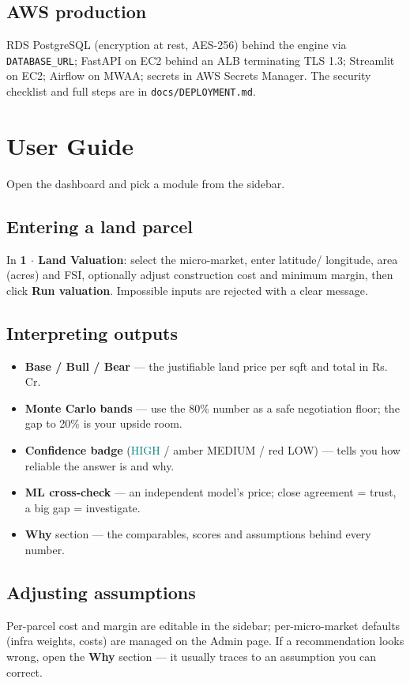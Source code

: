 \documentclass[11pt,a4paper]{article}
\begin{document}
\subsection{AWS production}
RDS PostgreSQL (encryption at rest, AES-256) behind the engine via
\texttt{DATABASE\_URL}; FastAPI on EC2 behind an ALB terminating TLS 1.3;
Streamlit on EC2; Airflow on MWAA; secrets in AWS Secrets Manager. The
security checklist and full steps are in \texttt{docs/DEPLOYMENT.md}.

\section{User Guide}
Open the dashboard and pick a module from the sidebar.

\subsection{Entering a land parcel}
In \textbf{1 $\cdot$ Land Valuation}: select the micro-market, enter latitude/
longitude, area (acres) and FSI, optionally adjust construction cost and minimum
margin, then click \textbf{Run valuation}. Impossible inputs are rejected with a
clear message.

\subsection{Interpreting outputs}
\begin{itemize}[noitemsep]
  \item \textbf{Base / Bull / Bear} --- the justifiable land price per sqft and total in  Rs.\,Cr.
  \item \textbf{Monte Carlo bands} --- use the 80\% number as a safe negotiation floor; the gap to 20\% is your upside room.
  \item \textbf{Confidence badge} (\textcolor{teal}{HIGH} / amber MEDIUM / red LOW) --- tells you how reliable the answer is and why.
  \item \textbf{ML cross-check} --- an independent model's price; close agreement = trust, a big gap = investigate.
  \item \textbf{Why} section --- the comparables, scores and assumptions behind every number.
\end{itemize}

\subsection{Adjusting assumptions}
Per-parcel cost and margin are editable in the sidebar; per-micro-market defaults
(infra weights, costs) are managed on the Admin page. If a recommendation looks
wrong, open the \textbf{Why} section --- it usually traces to an assumption you
can correct.
\end{document}
